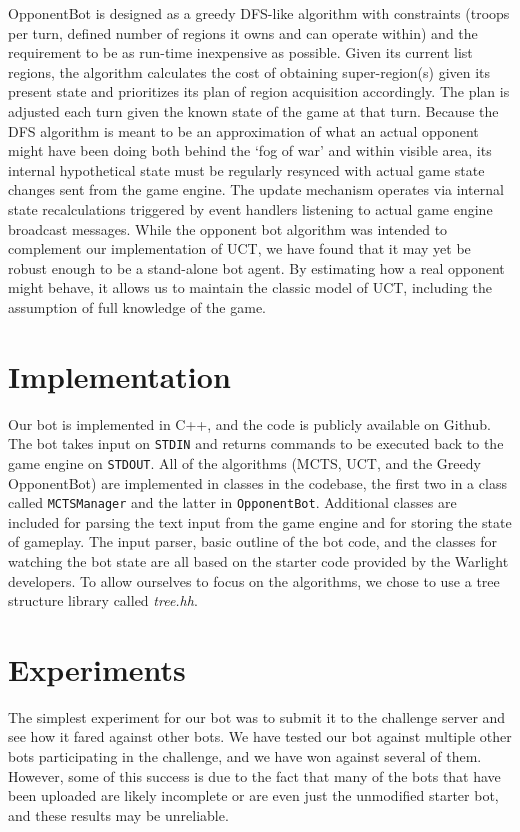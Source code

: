 \documentclass[a4paper,11pt]{article}
\newcommand{\code}[1]{\texttt{#1}}
\begin{document}
OpponentBot is designed as a greedy DFS-like algorithm with constraints (troops per turn,
defined number of regions it owns and can operate within) and the requirement to be as
run-time inexpensive as possible. Given its current list regions, the algorithm calculates
the cost of obtaining super-region(s) given its present state and prioritizes its plan of
region acquisition accordingly. The plan is adjusted each turn given the known state of the 
game at that turn. Because the DFS algorithm is meant to be an approximation of what an
actual opponent might have been doing both behind the `fog of war' and within visible area, 
its internal hypothetical state must be regularly resynced with actual game state changes
sent from the game engine.  The update mechanism operates via internal state recalculations 
triggered by event handlers listening to actual game engine broadcast messages. While the
opponent bot algorithm was intended to complement our implementation of UCT, we have found 
that it may yet be robust enough to be a stand-alone bot agent. By estimating how a real 
opponent might behave, it allows us to maintain the classic model of UCT, including the assumption of full knowledge of the game.

\section{Implementation}\label{sec:impl}
Our bot is implemented in C++, and the code is publicly available on Github\cite{github}.  The bot takes input on \code{STDIN} and returns commands to be executed back to the game engine on \code{STDOUT}.  All of the algorithms (MCTS, UCT, and the Greedy OpponentBot) are implemented in classes in the codebase, the first two in a class called \code{MCTSManager} and the latter in \code{OpponentBot}.  Additional classes are included for parsing the text input from the game engine and for storing the state of gameplay.  The input parser, basic outline of the bot code, and the classes for watching the bot state are all based on the starter code provided by the Warlight developers.  To allow ourselves to focus on the algorithms, we chose to use a tree structure library called \emph{tree.hh}\cite{treehh}.

\section{Experiments}\label{sec:experiments}
The simplest experiment for our bot was to submit it to the challenge server and see how it fared against other bots.  We have tested our bot against multiple other bots participating in the challenge, and we have won against several of them.  However, some of this success is due to the fact that many of the bots that have been uploaded are likely incomplete or are even just the unmodified starter bot, and these results may be unreliable.
\end{document}
